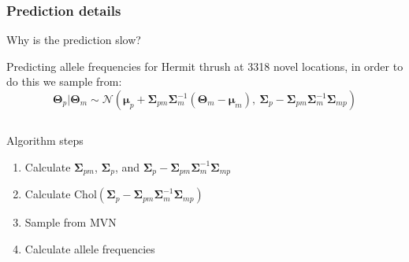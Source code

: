 \documentclass[t]{beamer}\usepackage[]{graphicx}\usepackage[]{color}
\begin{document}
\begin{frame}
\frametitle{Prediction details}

Why is the prediction slow? \pause 

\vspace{2mm}

Predicting allele frequencies for Hermit thrush at 3318 novel locations, in order to do this we sample from:
\[ \bm{\Theta}_p | \bm{\Theta}_m \sim \mathcal{N}(\bm{\mu}_p+\bm\Sigma_{pm}\bm\Sigma_{m}^{-1}(\bm{\Theta}_m-\bm\mu_m),\: \bm\Sigma_{p}-\bm\Sigma_{pm}\bm\Sigma_{m}^{-1}\bm\Sigma_{mp}) \]

\pause

\vspace{-3mm}

\begin{columns}
\begin{block}{Algorithm steps}
\begin{enumerate}
\item Calculate $\bm\Sigma_{pm}$, $\bm\Sigma_{p}$, and $\bm\Sigma_{p}-\bm\Sigma_{pm}\bm\Sigma_{m}^{-1}\bm\Sigma_{mp}$
\item Calculate $\text{Chol}(\bm\Sigma_{p}-\bm\Sigma_{pm}\bm\Sigma_{m}^{-1}\bm\Sigma_{mp})$
\item Sample from MVN
\item Calculate allele frequencies
\end{enumerate}
\end{block}
\end{columns}
\end{frame}

\end{document}
